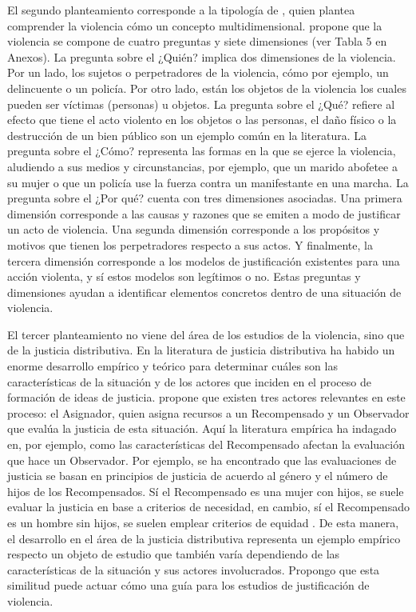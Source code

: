 \documentclass[12pt,twoside]{templates/facsothesis}
\begin{document}
El segundo planteamiento corresponde a la tipología de \citet{Imbusch2005}, quien plantea comprender la violencia cómo un concepto multidimensional. \citet{Imbusch2005} propone que la violencia se compone de cuatro preguntas y siete dimensiones (ver Tabla 5 en Anexos). La pregunta sobre el ¿Quién? implica dos dimensiones de la violencia. Por un lado, los sujetos o perpetradores de la violencia, cómo por ejemplo, un delincuente o un policía. Por otro lado, están los objetos de la violencia los cuales pueden ser víctimas (personas) u objetos. La pregunta sobre el ¿Qué? refiere al efecto que tiene el acto violento en los objetos o las personas, el daño físico o la destrucción de un bien público son un ejemplo común en la literatura. La pregunta sobre el ¿Cómo? representa las formas en la que se ejerce la violencia, aludiendo a sus medios y circunstancias, por ejemplo, que un marido abofetee a su mujer o que un policía use la fuerza contra un manifestante en una marcha. La pregunta sobre el ¿Por qué? cuenta con tres dimensiones asociadas. Una primera dimensión corresponde a las causas y razones que se emiten a modo de justificar un acto de violencia. Una segunda dimensión corresponde a los propósitos y motivos que tienen los perpetradores respecto a sus actos. Y finalmente, la tercera dimensión corresponde a los modelos de justificación existentes para una acción violenta, y sí estos modelos son legítimos o no. Estas preguntas y dimensiones ayudan a identificar elementos concretos dentro de una situación de violencia.

El tercer planteamiento no viene del área de los estudios de la violencia, sino que de la justicia distributiva. En la literatura de justicia distributiva ha habido un enorme desarrollo empírico y teórico para determinar cuáles son las características de la situación y de los actores que inciden en el proceso de formación de ideas de justicia. \citet{Jasso2016} propone que existen tres actores relevantes en este proceso: el Asignador, quien asigna recursos a un Recompensado y un Observador que evalúa la justicia de esta situación. Aquí la literatura empírica ha indagado en, por ejemplo, como las características del Recompensado afectan la evaluación que hace un Observador. Por ejemplo, se ha encontrado que las evaluaciones de justicia se basan en principios de justicia de acuerdo al género y el número de hijos de los Recompensados. Sí el Recompensado es una mujer con hijos, se suele evaluar la justicia en base a criterios de necesidad, en cambio, sí el Recompensado es un hombre sin hijos, se suelen emplear criterios de equidad \citep{Jasso1977}. De esta manera, el desarrollo en el área de la justicia distributiva representa un ejemplo empírico respecto un objeto de estudio que también varía dependiendo de las características de la situación y sus actores involucrados. Propongo que esta similitud puede actuar cómo una guía para los estudios de justificación de violencia.
\end{document}
